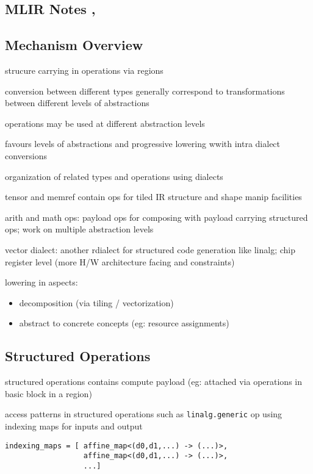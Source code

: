 \documentclass[8pt]{extarticle}
\begin{document}
\begin{multicols*}{2}
\vfill\null
\columnbreak

\section{MLIR Notes \cite{mlir2021}, \cite{lei2022}}

\subsection{Mechanism Overview}

strucure carrying in operations via regions

conversion between different types generally correspond to transformations between different levels of abstractions

operations may be used at different abstraction levels

favours levels of abstractions and progressive lowering wwith intra dialect conversions

organization of related types and operations using dialects

tensor and memref contain ops for tiled IR structure and shape manip facilities

arith and math ops: payload ops for composing with payload carrying structured ops; work on multiple abstraction levels

vector dialect: another rdialect for structured code generation like linalg; chip register level (more H/W architecture facing and constraints)

lowering in aspects:
\begin{itemize}
\item decomposition (via tiling / vectorization)
\item abstract to concrete concepts (eg: resource assignments)

\end{itemize}

\subsection{Structured Operations}

structured operations contains compute payload (eg: attached via operations in basic block in a region)

access patterns in structured operations such as \verb|linalg.generic| op using indexing maps for inputs and output

\begin{lstlisting}
indexing_maps = [ affine_map<(d0,d1,...) -> (...)>,
                  affine_map<(d0,d1,...) -> (...)>,
                  ...]


\end{lstlisting}
\end{multicols*}
\end{document}

